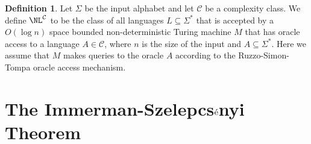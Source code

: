 \documentclass{amsbook}
\theoremstyle{definition}
\newtheorem{definition}[theorem]{Definition}
\theoremstyle{remark}
\numberwithin{section}{chapter}
\numberwithin{equation}{chapter}
\begin{document}
\begin{definition}
Let $\Sigma $ be the input alphabet and let $\mathcal{C}$ be a complexity class. We define $\NL^{\mathcal{C}}$ to be the class of all languages $L\subseteq\Sigma^*$ that is accepted by a $O(\log n)$ space bounded non-deterministic Turing machine $M$ that has oracle access to a language $A\in\mathcal{C}$, where $n$ is the size of the input and $A\subseteq\Sigma^*$. Here we assume that $M$ makes queries to the oracle $A$ according to the Ruzzo-Simon-Tompa oracle access mechanism.
\end{definition}

\section{The Immerman-Szelepcs$\rm\acute{e}$nyi Theorem}\label{chap02-immermanszelepcsenyitheorem}
\end{document}
